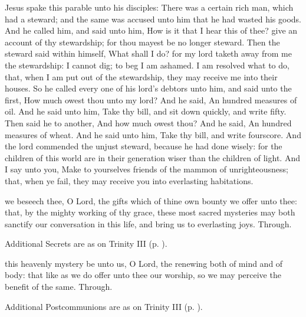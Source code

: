  Jesus spake this parable unto his disciples: There was a certain rich man, which had a steward; and the same was accused unto him that he had wasted his goods. And he called him, and said unto him, How is it that I hear this of thee? give an account of thy stewardship; for thou mayest be no longer steward. Then the steward said within himself, What shall I do? for my lord taketh away from me the stewardship: I cannot dig; to beg I am ashamed. I am resolved what to do, that, when I am put out of the stewardship, they may receive me into their houses. So he called every one of his lord's debtors unto him, and said unto the first, How much owest thou unto my lord? And he said, An hundred measures of oil. And he said unto him, Take thy bill, and sit down quickly, and write fifty. Then said he to another, And how much owest thou? And he said, An hundred measures of wheat. And he said unto him, Take thy bill, and write fourscore. And the lord commended the unjust steward, because he had done wisely: for the children of this world are in their generation wiser than the children of light. And I say unto you, Make to yourselves friends of the mammon of unrighteousness; that, when ye fail, they may receive you into everlasting habitations.


\secret
{} we beseech thee, O Lord, the gifts which of thine own bounty we offer unto thee: that, by the mighty working of thy grace, these most sacred mysteries may both sanctify our conversation in this life, and bring us to everlasting joys. Through.
\begin{rubric}
    Additional Secrets are as on Trinity III (p. \pageref{TrinityIII}).
\end{rubric}


\postcommunion
{} this heavenly mystery be unto us, O Lord, the renewing both of mind and of body: that like as we do offer unto thee our worship, so we may perceive the benefit of the same. Through.
\begin{rubric}
    Additional Postcommunions are as on Trinity III (p. \pageref{TrinityIII}).
\end{rubric}


